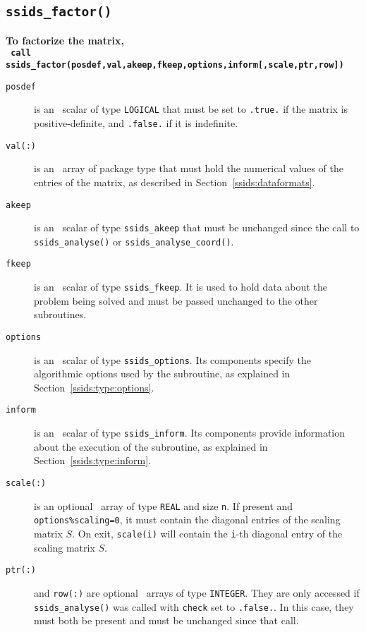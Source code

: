\subsection{\texttt{ssids\_factor()}}
\textbf{To factorize the matrix,
   \vspace*{0.1cm} \\
   \texttt{ \hspace*{0.2cm}
      call ssids\_factor(posdef,val,akeep,fkeep,options,inform[,scale,ptr,row])
   }
}

\begin{description}
\item[\texttt{posdef}] is an \intentin\ scalar of type {\tt LOGICAL} that
must be set to {\tt .true.} if the matrix is positive-definite, and
{\tt .false.} if it is indefinite.

\item[\texttt{val(:)}] is an \intentin\ array of package type that must hold
the numerical values of the entries of the matrix, as described in
Section~\ref{ssids:dataformats}.

\item[\texttt{akeep}]  is an \intentin\ scalar of type
{\tt ssids\_akeep} that must be unchanged since the
call to {\tt ssids\_analyse()} or {\tt ssids\_analyse\_coord()}.

\item[\texttt{fkeep}]  is an \intentinout\ scalar of type
{\tt ssids\_fkeep}. It is used to hold data about the problem being
solved and must be passed unchanged to the other subroutines.

\item[\texttt{options}] is an \intentin\ scalar of type {\tt ssids\_options}.
Its components specify the algorithmic options used by the subroutine, as
explained in Section~\ref{ssids:type:options}.

\item[\texttt{inform}] is an \intentout\ scalar of type
{\tt ssids\_inform}. Its components provide information about the execution
of the subroutine, as explained in Section~\ref{ssids:type:inform}.

\item[\texttt{scale(:)}] is an optional \intentinout\ array of type {\tt REAL}
and size {\tt n}. If present and \texttt{options\%scaling=0}, it must contain
the diagonal entries of the scaling matrix ${S}$. On exit, \texttt{scale(i)}
will contain the \texttt{i}-th diagonal entry of the scaling matrix $S$.

\item[\texttt{ptr(:)}] and {\tt row(:)} are optional \intentin\ arrays of
type {\tt INTEGER}. They are only accessed if {\tt ssids\_analyse()} was called
with {\tt check} set to {\tt .false.}.
In this case, they must both be present and  must be unchanged since that call.

\end{description}

